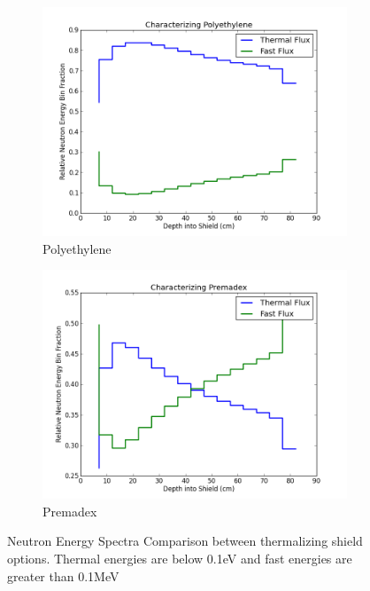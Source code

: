 \documentclass{mc2015}
\begin{document}
\begin{figure}[H]
	\centering
	\begin{subfigure}{0.49\textwidth}
		\includegraphics[width=\textwidth]{Poly_char.png}
		\caption{Polyethylene}
		\label{fig:polychar}
	\end{subfigure}
	\begin{subfigure}{0.49\textwidth}
		\includegraphics[width=\textwidth]{Prem_char.png}
		\caption{Premadex}
		\label{fig:premchar}
	\end{subfigure}
	\caption{Neutron Energy Spectra Comparison between thermalizing shield options. Thermal energies are below 0.1eV and fast energies are greater than 0.1MeV}
	\label{fig:chars}
\end{figure}
\end{document}

